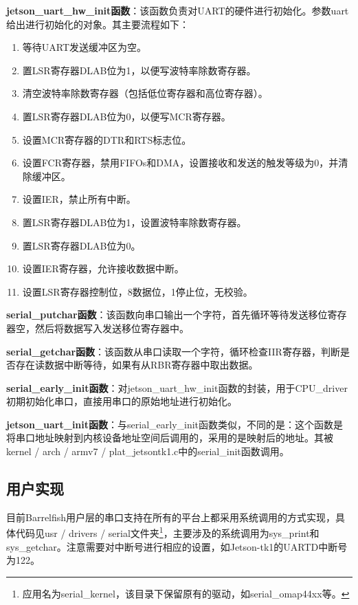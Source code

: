\documentclass[a4paper, 12pt]{report}
\begin{document}
    \textbf{jetson\_uart\_hw\_init函数}：该函数负责对UART的硬件进行初始化。参数uart给出进行初始化的对象。其主要流程如下：
    
    \begin{enumerate}
        \item 等待UART发送缓冲区为空。
        \item 置LSR寄存器DLAB位为1，以便写波特率除数寄存器。
        \item 清空波特率除数寄存器（包括低位寄存器和高位寄存器）。
        \item 置LSR寄存器DLAB位为0，以便写MCR寄存器。
        \item 设置MCR寄存器的DTR和RTS标志位。
        \item 设置FCR寄存器，禁用FIFOs和DMA，设置接收和发送的触发等级为0，并清除缓冲区。
        \item 设置IER，禁止所有中断。
        \item 置LSR寄存器DLAB位为1，设置波特率除数寄存器。
        \item 置LSR寄存器DLAB位为0。
        \item 设置IER寄存器，允许接收数据中断。
        \item 设置LSR寄存器控制位，8数据位，1停止位，无校验。
    \end{enumerate}
    
    \textbf{serial\_putchar函数}：该函数向串口输出一个字符，首先循环等待发送移位寄存器空，然后将数据写入发送移位寄存器中。
    
    \textbf{serial\_getchar函数}：该函数从串口读取一个字符，循环检查IIR寄存器，判断是否存在读数据中断等待，如果有从RBR寄存器中取出数据。
    
    \textbf{serial\_early\_init函数}：对jetson\_uart\_hw\_init函数的封装，用于CPU\_driver初期初始化串口，直接用串口的原始地址进行初始化。
    
    \textbf{jetson\_uart\_init函数}：与serial\_early\_init函数类似，不同的是：这个函数是将串口地址映射到内核设备地址空间后调用的，采用的是映射后的地址。其被kernel / arch / armv7 / plat\_jetsontk1.c中的serial\_init函数调用。
    
    \subsection{用户实现}
    
    目前Barrelfish用户层的串口支持在所有的平台上都采用系统调用的方式实现，具体代码见usr / drivers / serial文件夹\footnote{应用名为serial\_kernel，该目录下保留原有的驱动，如serial\_omap44xx等。}，主要涉及的系统调用为sys\_print和sys\_getchar。注意需要对中断号进行相应的设置，如Jetson-tk1的UARTD中断号为122。
    
\end{document}
